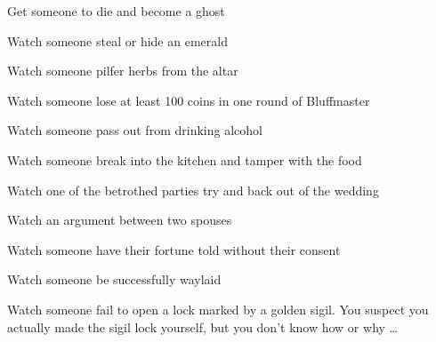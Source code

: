 \documentclass[char]{Kos}
\begin{document}
\begin{itemz}[Goals]
 \item Get someone to die and become a ghost
 \item Watch someone steal or hide an emerald
 \item Watch someone pilfer herbs from the altar
 \item Watch someone lose at least 100 coins in one round of Bluffmaster
 \item Watch someone pass out from drinking alcohol
  \item Watch someone break into the kitchen and tamper with the food
   \item Watch one of the betrothed parties try and back out of the wedding
    \item Watch an argument between two spouses
     \item Watch someone have their fortune told without their consent
      \item Watch someone be successfully waylaid
       \item Watch someone fail to open a lock marked by a golden sigil. You suspect you actually made the sigil lock yourself, but you don't know how or why \ldots
\end{itemz}
\end{document}

